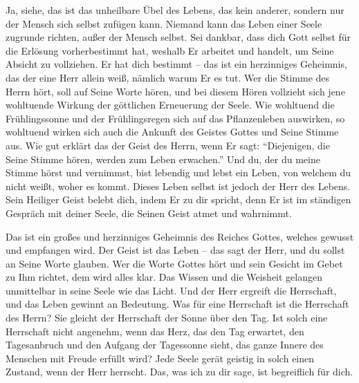 Ja, siehe, das ist das unheilbare Übel des Lebens, das kein anderer, sondern nur der Mensch sich selbst zufügen kann. Niemand kann das Leben einer Seele zugrunde richten, außer der Mensch selbst. Sei dankbar, dass dich Gott selbst für die Erlösung vorherbestimmt hat, weshalb Er arbeitet und handelt, um Seine Absicht zu vollziehen. Er hat dich bestimmt -- das ist ein herzinniges Geheimnis, das der eine Herr allein weiß, nämlich warum Er es tut. Wer die Stimme des Herrn hört, soll auf Seine Worte hören, und bei diesem Hören vollzieht sich jene wohltuende Wirkung der göttlichen Erneuerung der Seele. Wie wohltuend die Frühlingssonne und der Frühlingsregen sich auf das Pflanzenleben auswirken, so wohltuend wirken sich auch die Ankunft des Geistes Gottes und Seine Stimme aus. Wie gut erklärt das der Geist des Herrn, wenn Er sagt: "`Diejenigen, die Seine Stimme hören, werden zum Leben erwachen."' Und du, der du meine Stimme hörst und vernimmst, bist lebendig und lebst ein Leben, von welchem du nicht weißt, woher es kommt. Dieses Leben selbst ist jedoch der Herr des Lebens. Sein Heiliger Geist belebt dich, indem Er zu dir spricht, denn Er ist im ständigen Gespräch mit deiner Seele, die Seinen Geist atmet und wahrnimmt.

Das ist ein großes und herzinniges Geheimnis des Reiches Gottes, welches gewusst und empfangen wird. Der Geist ist das Leben -- das sagt der Herr, und du sollst an Seine Worte glauben. Wer die Worte Gottes hört und sein Gesicht im Gebet zu Ihm richtet, dem wird alles klar. Das Wissen und die Weisheit gelangen unmittelbar in seine Seele wie das Licht. Und der Herr ergreift die Herrschaft, und das Leben gewinnt an Bedeutung. Was für eine Herrschaft ist die Herrschaft des Herrn? Sie gleicht der Herrschaft der Sonne über den Tag. Ist solch eine Herrschaft nicht angenehm, wenn das Herz, das den Tag erwartet, den Tagesanbruch und den Aufgang der Tagessonne sieht, das ganze Innere des Menschen mit Freude erfüllt wird? Jede Seele gerät geistig in solch einen Zustand, wenn der Herr herrscht. Das, was ich zu dir sage, ist begreiflich für dich. 

